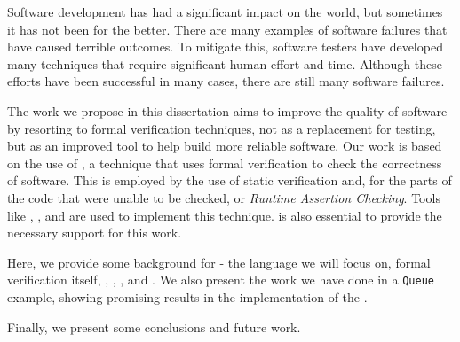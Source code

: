 

Software development has had a significant impact on the world, but sometimes it has not 
been for the better. There are many examples of software failures that have caused terrible 
outcomes. To mitigate this, software testers have developed many techniques that require 
significant human effort and time. Although these efforts have been successful in many cases, 
there are still many software failures.

The work we propose in this dissertation aims to improve the quality of software by resorting 
to formal verification techniques, not as a replacement for testing, but as an improved tool to 
help build more reliable software. Our work is based on the use of \monitors, a technique that 
uses formal verification to check the correctness of software. This is employed by the use 
of static verification and, for the parts of the code that were unable to be checked, \rac 
or \textit{Runtime Assertion Checking}. Tools like \gospellang, \ortac, and \cameleer are 
used to implement this technique. \why is also essential to provide the necessary support 
for this work.

Here, we provide some background for \ocaml - the language we will focus on, formal verification 
itself, \gospellang, \ortac, \cameleer, and \why. We also present the work we have done in a 
\texttt{Queue} example, showing promising results in the implementation of the \monitors. 

Finally, we present some conclusions and future work.


